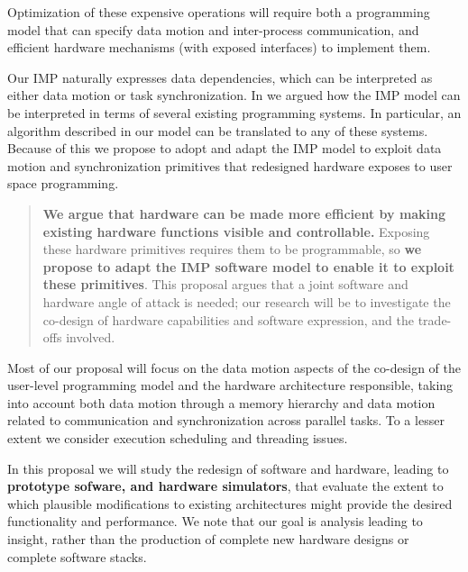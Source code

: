 Optimization of these expensive operations will require both a programming 
model that can specify data motion and inter-process communication, and 
efficient hardware mechanisms (with exposed interfaces) to implement them. 



Our \acf{IMP} naturally expresses data dependencies,
which can be interpreted as either data motion or task synchronization.
In \cite{Eijkhout:hips2014} we argued how the \ac{IMP} model
can be interpreted in terms of several existing programming systems.
In particular, an algorithm described in our model can be 
translated to any of these systems. Because of this we propose 
to adopt and adapt the \ac{IMP} model to exploit
data motion and synchronization primitives that redesigned hardware
exposes to user space programming.
\begin{quotation}
  \noindent \textbf{We argue that hardware can be made more efficient
    by making existing hardware functions visible and controllable.}  Exposing these
    hardware primitives requires them to be programmable, so \textbf{we
    propose to adapt the IMP software model to enable it to exploit
    these primitives}.  This proposal argues that a joint software and
  hardware angle of attack is needed; our research will be to
  investigate the co-design of hardware capabilities and software
  expression, and the trade-offs involved.
\end{quotation}

Most of our proposal will
focus on the data motion aspects of the co-design of the
user-level programming model and the 
hardware architecture responsible, taking into
account both data motion through a memory hierarchy and data 
motion related to communication and synchronization across
parallel tasks.  To a lesser extent we consider execution scheduling
and threading issues.

In this proposal we will study the redesign of software and hardware,
leading to \textbf{prototype sofware, and hardware simulators},
that evaluate the extent to which plausible
modifications to existing architectures might provide the desired
functionality and performance. We note that our goal is analysis leading to
insight, rather than the production of complete new hardware 
designs or complete software stacks.


